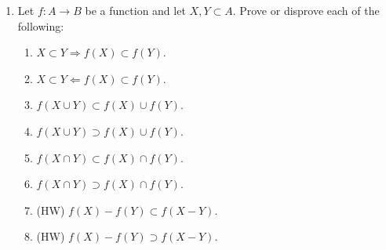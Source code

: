 \documentclass[12pt, reqno]{amsart}
\begin{document}
\begin{enumerate}
\item   Let $f\colon A \to B$ be a function and let $X,Y \subset A$. Prove
  or disprove each of the following:
  \begin{enumerate}
  \item $X \subset Y \Rightarrow f(X) \subset f(Y)$.
  \item $X \subset Y \Leftarrow f(X) \subset f(Y)$.
  \item $f(X \cup Y) \subset f(X) \cup f(Y)$.
  \item $f(X \cup Y) \supset f(X) \cup f(Y)$.
  \item $f(X \cap Y) \subset f(X) \cap f(Y)$.
  \item $f(X \cap Y) \supset f(X) \cap f(Y)$.
  \item (HW) $f(X) - f(Y) \subset f(X - Y)$.
  \item (HW) $f(X) - f(Y) \supset f(X - Y)$.
\end{enumerate}  

  \end{enumerate}
\end{document}
